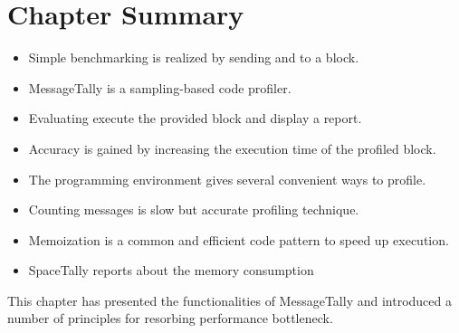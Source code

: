 \documentclass[a4paper,10pt,twoside]{book}
\begin{document}
\section{Chapter Summary}
\begin{itemize}
\item Simple benchmarking is realized by sending  and  to a block.
\item MessageTally is a sampling-based code profiler.
\item Evaluating  execute the provided block and display a report.
\item Accuracy is gained by increasing the execution time of the profiled block.
\item The \pharo programming environment gives several convenient ways to profile.
\item Counting messages is slow but accurate profiling technique.
\item Memoization is a common and efficient code pattern to speed up execution.
\item SpaceTally reports about the memory consumption
\end{itemize}

This chapter has presented the functionalities of MessageTally and introduced a number of principles for resorbing performance bottleneck. 



\ifx\wholebook\relax\else
\end{document}
